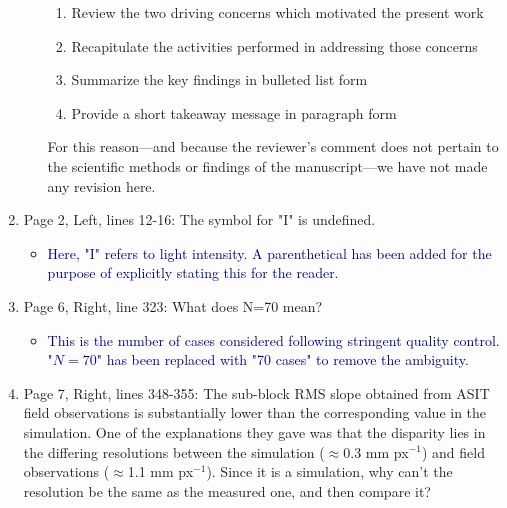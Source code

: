 \documentclass[14pt,letterpaper]{article}
\begin{document}
\begin{enumerate}
\begin{itemize}
{        \begin{enumerate}
            \item Review the two driving concerns which motivated the present work
            \item Recapitulate the activities performed in addressing those concerns
            \item Summarize the key findings in bulleted list form
            \item Provide a short takeaway message in paragraph form
        \end{enumerate}
        For this reason---and because the reviewer's comment does not pertain to the scientific methods or findings of the manuscript---we have not made any revision here.}
    \end{itemize}
    \item Page 2, Left, lines 12-16: The symbol for "I" is undefined.
    \begin{itemize}
        \item \textcolor{darkblue}{Here, "I" refers to light intensity. A parenthetical has been added for the purpose of explicitly stating this for the reader.}
    \end{itemize}
    \item Page 6, Right, line 323: What does N=70 mean?
    \begin{itemize}
        \item \textcolor{darkblue}{This is the number of cases considered following stringent quality control. "$N=70$" has been replaced with "70 cases" to remove the ambiguity.}
    \end{itemize}
    \item Page 7, Right, lines 348-355: The sub-block RMS slope obtained from ASIT field observations is substantially lower than the corresponding value in the simulation. One of the explanations they gave was that the disparity lies in the differing resolutions between the simulation ($\approx$0.3 mm px$^{-1}$) and field observations ($\approx$1.1 mm px$^{-1}$). Since it is a simulation, why can't the resolution be the same as the measured one, and then compare it?
    \begin{itemize}

\end{itemize}
\end{enumerate}
\end{document}
